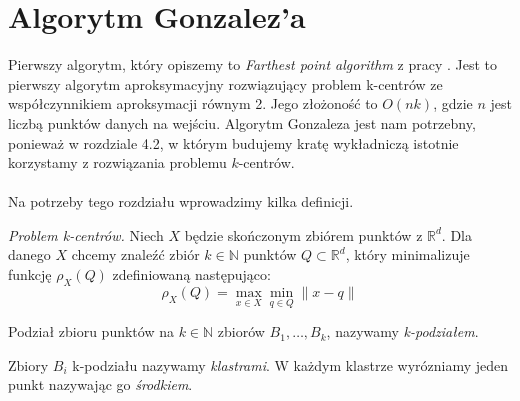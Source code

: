 \section{Algorytm Gonzalez'a}

Pierwszy algorytm, który opiszemy to \textit{Farthest point algorithm} z pracy \cite{Gonzalez1985ClusteringTM}.
Jest to pierwszy algorytm aproksymacyjny rozwiązujący problem k-centrów ze współczynnikiem aproksymacji równym 2.
Jego złożoność to $O(nk)$, gdzie $n$ jest liczbą punktów danych na wejściu.
Algorytm Gonzaleza jest nam potrzebny, ponieważ w rozdziale 4.2, w którym budujemy kratę wykładniczą istotnie korzystamy z rozwiązania problemu $k$-centrów.
\\~\\
Na potrzeby tego rozdziału wprowadzimy kilka definicji.
\begin{definition}
    \emph{Problem k-centrów.} Niech $X$ będzie skończonym zbiórem punktów z $\mathbb{R}^{d}$. 
    Dla danego $X$ chcemy znaleźć zbiór $k \in \mathbb{N}$ punktów $Q \subset \mathbb{R}^{d}$, który minimalizuje funkcję $\rho_{X}(Q)$ zdefiniowaną następująco:
    \begin{equation}
        \rho_{X}(Q) = \max_{x \in X} \min_{q \in Q} \| x - q \|
    \end{equation}
\end{definition}

\begin{definition}
    Podział zbioru punktów na $k \in \mathbb{N}$ zbiorów $B_{1},\dots,B_{k}$, nazywamy \emph{k-podziałem}.
\end{definition}

\begin{definition}
    Zbiory $B_{i}$ k-podziału nazywamy \emph{klastrami}.
    W każdym klastrze wyrózniamy jeden punkt nazywając go \emph{środkiem}.
\end{definition}

